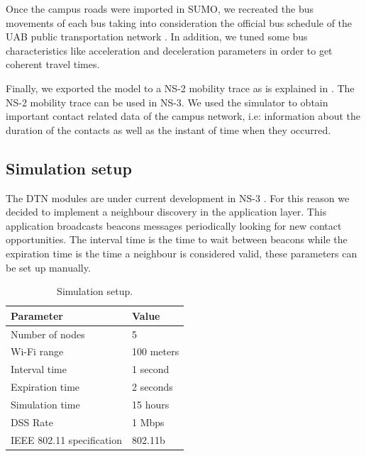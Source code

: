 Once the campus roads were imported in SUMO, we recreated the bus movements of each bus taking into consideration the official bus schedule of the UAB public transportation network \cite{bus-schedule}. In addition, we tuned some bus characteristics like acceleration and deceleration parameters in order to get coherent travel times.

Finally, we exported the model to a NS-2 mobility trace as is explained in \cite{sumo-to-ns-2}. The NS-2 mobility trace can be used in NS-3. We used the simulator to obtain important contact related data of the campus network, i.e: information about the duration of the contacts as well as the instant of time when they occurred.

\subsection{Simulation setup}


The DTN modules are under current development in NS-3 \cite{ns-3-dtn}. For this reason we decided to implement a neighbour discovery in the application layer. This application broadcasts beacons messages periodically looking for new contact opportunities. The interval time is the time to wait between beacons while the expiration time is the time a neighbour is considered valid, these parameters can be set up manually.

\begin{table}[h]
\centering
\begin{tabular}{l|l}
Parameter & Value \\
\hline
Number of nodes & 5 \\
Wi-Fi range & 100 meters \\
Interval time & 1 second \\
Expiration time & 2 seconds \\
Simulation time & 15 hours \\
DSS Rate & 1 Mbps \\
IEEE 802.11 specification & 802.11b
\end{tabular}
\caption{Simulation setup.}
\label{table:simulation-parameters}
\end{table}

